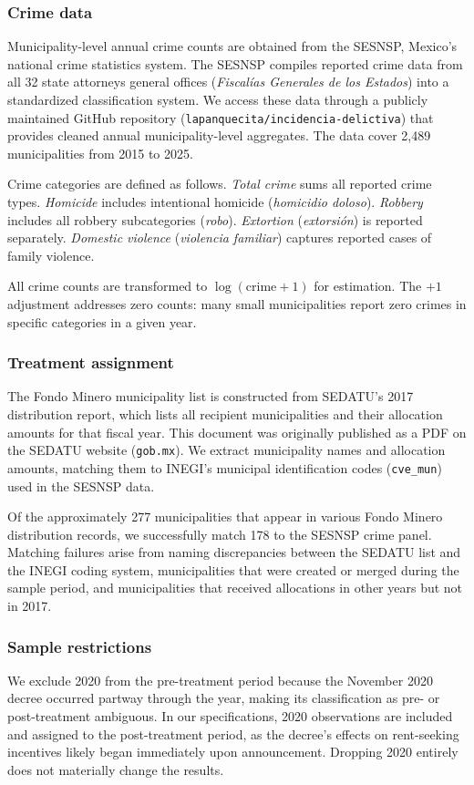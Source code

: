 \documentclass[12pt]{article}
\begin{document}
\subsubsection*{Crime data} Municipality-level annual crime counts are obtained from the SESNSP, Mexico's national crime statistics system. The SESNSP compiles reported crime data from all 32 state attorneys general offices (\textit{Fiscal\'{i}as Generales de los Estados}) into a standardized classification system. We access these data through a publicly maintained GitHub repository (\texttt{lapanquecita/incidencia-delictiva}) that provides cleaned annual municipality-level aggregates. The data cover 2,489 municipalities from 2015 to 2025.

Crime categories are defined as follows. \textit{Total crime} sums all reported crime types. \textit{Homicide} includes intentional homicide (\textit{homicidio doloso}). \textit{Robbery} includes all robbery subcategories (\textit{robo}). \textit{Extortion} (\textit{extorsi\'{o}n}) is reported separately. \textit{Domestic violence} (\textit{violencia familiar}) captures reported cases of family violence.

All crime counts are transformed to $\log(\text{crime} + 1)$ for estimation. The $+1$ adjustment addresses zero counts: many small municipalities report zero crimes in specific categories in a given year.

\subsubsection*{Treatment assignment} The Fondo Minero municipality list is constructed from SEDATU's 2017 distribution report, which lists all recipient municipalities and their allocation amounts for that fiscal year. This document was originally published as a PDF on the SEDATU website (\texttt{gob.mx}). We extract municipality names and allocation amounts, matching them to INEGI's municipal identification codes (\texttt{cve\_mun}) used in the SESNSP data.

Of the approximately 277 municipalities that appear in various Fondo Minero distribution records, we successfully match 178 to the SESNSP crime panel. Matching failures arise from naming discrepancies between the SEDATU list and the INEGI coding system, municipalities that were created or merged during the sample period, and municipalities that received allocations in other years but not in 2017.

\subsubsection*{Sample restrictions} We exclude 2020 from the pre-treatment period because the November 2020 decree occurred partway through the year, making its classification as pre- or post-treatment ambiguous. In our specifications, 2020 observations are included and assigned to the post-treatment period, as the decree's effects on rent-seeking incentives likely began immediately upon announcement. Dropping 2020 entirely does not materially change the results.
\end{document}

